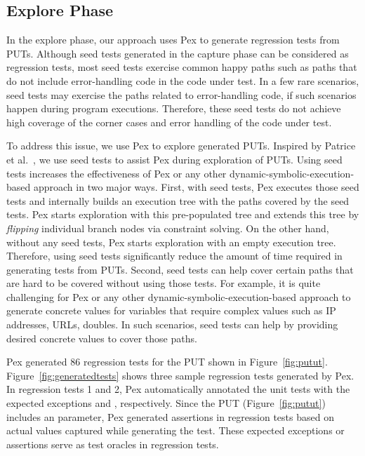\subsection{Explore Phase}
\label{sec:explore}

In the explore phase, our approach uses Pex to generate regression tests from PUTs. Although seed tests generated in the capture phase can be considered as regression tests, most seed tests exercise common happy paths such as paths that do not include error-handling code in the code under test. In a few rare scenarios, seed tests may exercise the paths related to error-handling code, if such scenarios happen during program executions. Therefore, these seed tests do not achieve high coverage of the corner cases and error handling of the code under test.

To address this issue, we use Pex to explore generated PUTs. Inspired by Patrice et al.~\cite{patrice08:whitebox}, we use seed tests to assist Pex during exploration of PUTs. Using seed tests increases the effectiveness of Pex or any other dynamic-symbolic-execution-based approach in two major ways. First, with seed tests, Pex executes those seed tests and internally builds an execution tree with the paths covered by the seed tests. Pex starts exploration with this pre-populated tree and extends this tree by \emph{flipping} individual branch nodes via constraint solving. On the other hand, without any seed tests, Pex starts exploration with an empty execution tree. Therefore, using seed tests significantly reduce the amount of time required in generating tests from PUTs. Second, seed tests can help cover certain paths that are hard to be covered without using those tests. For example, it is quite challenging for Pex or any other dynamic-symbolic-execution-based approach to generate concrete values for variables
that require complex values such as IP addresses, URLs, doubles. In such scenarios, seed tests can help by providing desired concrete values to cover those paths.

Pex generated $86$ regression tests for the PUT shown in Figure~\ref{fig:putut}. Figure~\ref{fig:generatedtests} shows three sample regression tests generated by Pex. In regression tests 1 and 2, Pex automatically annotated the unit tests with the expected exceptions  and , respectively. Since the PUT (Figure~\ref{fig:putut}) includes an  parameter, Pex generated assertions in regression tests based on actual values captured while 
generating the test. These expected exceptions or assertions serve as test oracles in regression tests.

